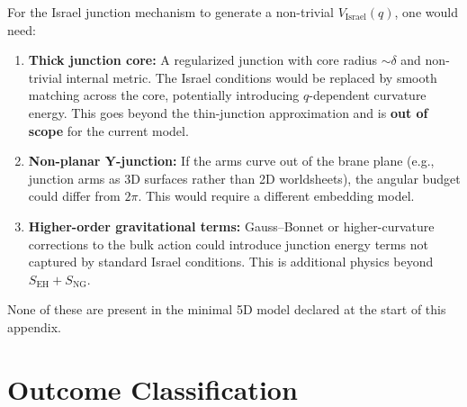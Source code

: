For the Israel junction mechanism to generate a non-trivial
$V_{\mathrm{Israel}}(q)$, one would need:
\begin{enumerate}
    \item \textbf{Thick junction core:} A regularized junction with
          core radius $\sim \delta$ and non-trivial internal metric.
          The Israel conditions would be replaced by smooth matching
          across the core, potentially introducing $q$-dependent
          curvature energy. This goes beyond the thin-junction
          approximation and is \textbf{out of scope} for the current
          model.
    \item \textbf{Non-planar Y-junction:} If the arms curve out of the
          brane plane (e.g., junction arms as 3D surfaces rather than
          2D worldsheets), the angular budget could differ from $2\pi$.
          This would require a different embedding model.
    \item \textbf{Higher-order gravitational terms:} Gauss--Bonnet or
          higher-curvature corrections to the bulk action could introduce
          junction energy terms not captured by standard Israel conditions.
          This is additional physics beyond $S_{\mathrm{EH}} + S_{\mathrm{NG}}$.
\end{enumerate}

None of these are present in the minimal 5D model declared at the
start of this appendix.

\section{Outcome Classification}
\label{sec:P2WP2:outcome}

